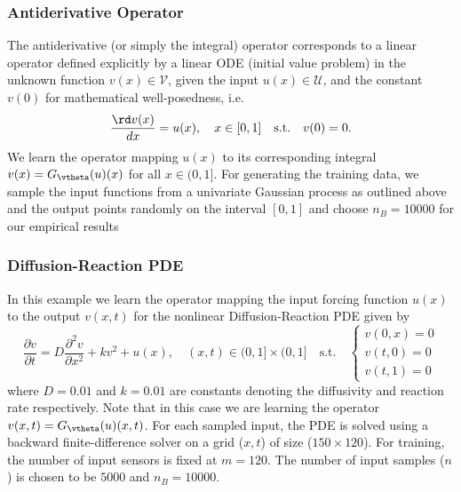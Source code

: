 \subsubsection{Antiderivative Operator}\label{subsec:Antiderivative_Experiments}
The antiderivative (or simply the integral) operator corresponds to a linear operator defined explicitly by a linear ODE (initial value problem) in the unknown function $v(x)\in\mathcal{V}$, given the input $u(x)\in \mathcal{U}$, and the constant $v(0)$ for mathematical well-posedness, i.e.
\begin{equation}
    \frac{\rd v(x)}{d x} = u(x), \quad x \in[0,1] \quad \text{s.t.} \quad v(0) = 0.
\end{equation}
We learn the operator mapping $u(x)$ to its corresponding integral $v(x) = G_{\vtheta}(u)(x)$ for all $x\in(0, 1]$. For generating the training data, we sample the input functions from a univariate Gaussian process as outlined above and the output points randomly on the interval $[0, 1]$ and choose $n_B = 10000$ for our empirical results
\subsubsection{Diffusion-Reaction PDE}
In this example we learn the operator mapping the input forcing function $u(x)$ to the output $v(x,t)$ for the nonlinear Diffusion-Reaction PDE given by
\begin{equation}
    \frac{\partial v}{\partial t}=D \frac{\partial^{2} v}{\partial x^{2}}
    +
    k v^{2} + u(x), \quad(x, t) \in(0,1] \times(0,1] \quad \text{s.t.}\quad \begin{cases}
    v(0,x)=0\\
    v(t,0)=0\\
    v(t,1)=0
    \end{cases}
    \label{eq:PDE_DiffusionReaction}
\end{equation}
where $D=0.01$ and $k=0.01$ are constants denoting the diffusivity and reaction rate respectively. Note that in this case we are learning the operator $v(x,t) = G_{\vtheta}(u)(x, t)$. For each sampled input, the PDE is solved using a backward finite-difference solver on a grid ($x,t$) of size ($150\times 120$). For training, the number of input sensors is fixed at $m=120$. The number of input samples ($n$) is chosen to be $5000$ and $n_B = 10000$.

